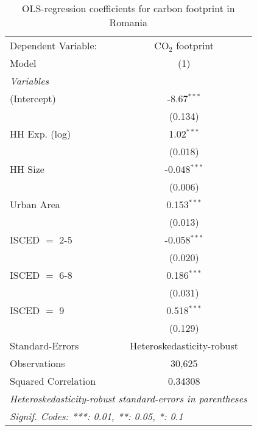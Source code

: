 
\begin{table}[htbp!]
   \centering
   \small
   \begin{adjustbox}{width = 1\textwidth, max height = 0.95\textheight, center}
      \begin{threeparttable}[b]
         \caption{\label{tab:OLS_2_ROU} OLS-regression coefficients for carbon footprint in Romania}
         \begin{tabular}{lc}
            \tabularnewline \midrule \midrule
            Dependent Variable: & CO$_{2}$ footprint\\  
            Model               & (1)\\  
            \midrule
            \emph{Variables}\\
            (Intercept)         & -8.67$^{***}$\\   
                                & (0.134)\\   
            HH Exp. (log)       & 1.02$^{***}$\\   
                                & (0.018)\\   
            HH Size             & -0.048$^{***}$\\   
                                & (0.006)\\   
            Urban Area          & 0.153$^{***}$\\   
                                & (0.013)\\   
            ISCED $=$ 2-5       & -0.058$^{***}$\\   
                                & (0.020)\\   
            ISCED $=$ 6-8       & 0.186$^{***}$\\   
                                & (0.031)\\   
            ISCED $=$ 9         & 0.518$^{***}$\\   
                                & (0.129)\\   
            \midrule 
            Standard-Errors     & Heteroskedasticity-robust \\   
            Observations        & 30,625\\  
            Squared Correlation & 0.34308\\  
            \midrule \midrule
            \multicolumn{2}{l}{\emph{Heteroskedasticity-robust standard-errors in parentheses}}\\
            \multicolumn{2}{l}{\emph{Signif. Codes: ***: 0.01, **: 0.05, *: 0.1}}\\
         \end{tabular}
         

\end{threeparttable}
\end{adjustbox}
\end{table}
